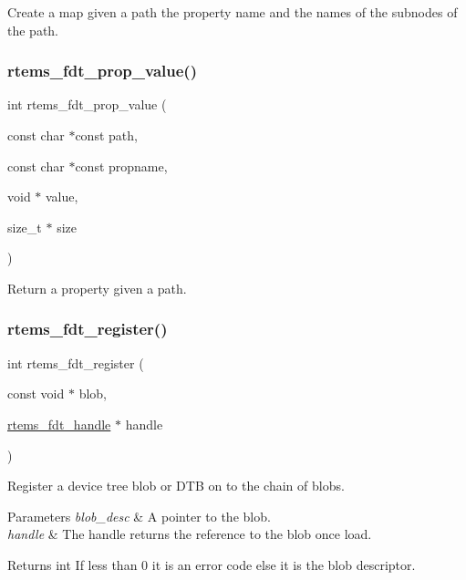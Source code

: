 Create a map given a path the property name and the names of the subnodes of the path. \mbox{\label{rtems-fdt_8h_ab80bd246991e1af0ae5b67ad548f75c2}} 
\subsubsection{\texorpdfstring{rtems\_fdt\_prop\_value()}{rtems\_fdt\_prop\_value()}}
{\footnotesize\ttfamily int rtems\+\_\+fdt\+\_\+prop\+\_\+value (\begin{DoxyParamCaption}\item[{const char $\ast$const}]{path,  }\item[{const char $\ast$const}]{propname,  }\item[{void $\ast$}]{value,  }\item[{size\+\_\+t $\ast$}]{size }\end{DoxyParamCaption})}

Return a property given a path. \mbox{\label{rtems-fdt_8h_ad6903d840a58d8b99ede97ac20bd94af}} 
\subsubsection{\texorpdfstring{rtems\_fdt\_register()}{rtems\_fdt\_register()}}
{\footnotesize\ttfamily int rtems\+\_\+fdt\+\_\+register (\begin{DoxyParamCaption}\item[{const void $\ast$}]{blob,  }\item[{\mbox{\hyperlink{structrtems__fdt__handle}{rtems\+\_\+fdt\+\_\+handle}} $\ast$}]{handle }\end{DoxyParamCaption})}

Register a device tree blob or D\+TB on to the chain of blobs.


\begin{DoxyParams}{Parameters}
{\em blob\+\_\+desc} & A pointer to the blob. \\
\hline
{\em handle} & The handle returns the reference to the blob once load. \\
\hline
\end{DoxyParams}
\begin{DoxyReturn}{Returns}
int If less than 0 it is an error code else it is the blob descriptor. 
\end{DoxyReturn}
\mbox{\label{rtems-fdt_8h_aef15751554a2804bbde895bf07dffe80}} 

